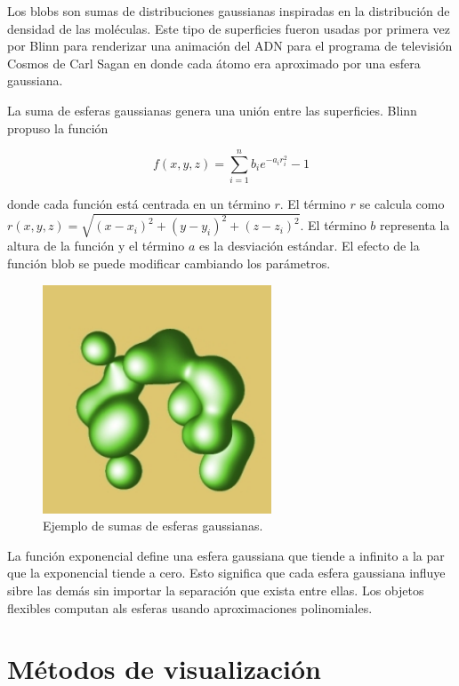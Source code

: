Los blobs son sumas de distribuciones gaussianas inspiradas en la distribución de densidad de las moléculas. Este tipo de superficies fueron usadas por primera vez por Blinn \cite{Blinn82} para renderizar una animación del ADN para el programa de televisión Cosmos de Carl Sagan en donde cada átomo era aproximado por una esfera gaussiana.
\par La suma de esferas gaussianas genera una unión entre las superficies. Blinn propuso la función

\begin{equation}
f(x,y,z) = \sum_{i=1}^{n} b_i e^{-a_i r_i^2} - 1
\nonumber
\end{equation}

donde cada función está centrada en un término $r$. El término $r$ se calcula como $r(x,y,z) = \sqrt{(x - x_i)^2 + (y-y_i)^2 + (z-z_i)^2}$. El término $b$ representa la altura de la función y el término $a$ es la desviación estándar. El efecto de la función blob se puede modificar cambiando los parámetros.

\begin{figure}[h]
	\centering
	\includegraphics[scale=0.7]{images/florez3.png}
	\caption{Ejemplo de sumas de esferas gaussianas.}
\end{figure}

La función exponencial define una esfera gaussiana que tiende a infinito a la par que la exponencial tiende a cero. Esto significa que cada esfera gaussiana influye sibre las demás sin importar la separación que exista entre ellas. Los objetos flexibles\cite{Wyvill86} computan als esferas usando aproximaciones polinomiales.

\section{Métodos de visualización}


